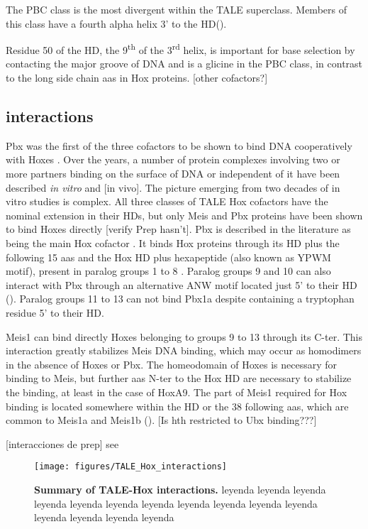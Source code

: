 The PBC class is the most divergent within the \ac{TALE} superclass. Members of this class have a fourth alpha helix 3' to the \ac{HD}(\cite{Mukherjee2007}). 

Residue 50 of the \ac{HD}, the 9\textsuperscript{th} of the 3\textsuperscript{rd} helix, is important for base selection by contacting the major groove of DNA and is a glicine in the PBC class, in contrast to the long side chain \acp{aa} in Hox proteins. [other cofactors?]

\subsection{interactions}

Pbx was the first of the three cofactors to be shown to bind DNA cooperatively with Hoxes \cite{Chan1994}. Over the years, a number of protein complexes involving two or more partners binding on the surface of DNA or independent of it have been described \textit{in vitro} and [in vivo]. The picture emerging from two decades of in vitro studies is complex. 
All three classes of \ac{TALE} Hox cofactors have the nominal extension in their \acp{HD}, but only Meis and Pbx proteins have been shown to bind Hoxes directly [verify Prep hasn't]. Pbx is described in the literature as being the main Hox cofactor \cite{ref}. It binds Hox proteins through its \ac{HD} plus the following 15 \acp{aa} and the Hox \ac{HD} plus hexapeptide (also known as YPWM motif), present in paralog groups 1 to 8 \cite{Chang1995, Passner1999}. Paralog groups 9 and 10 can also interact with Pbx through an alternative ANW motif located just 5' to their \ac{HD} (\cite{Chang1996, Shen1997a}). Paralog groups 11 to 13 can not bind Pbx1a despite containing a tryptophan residue 5' to their \ac{HD}. 

Meis1 can bind directly Hoxes belonging to groups 9 to 13 through its \ac{C-ter}. This interaction greatly stabilizes Meis DNA binding, which may occur as homodimers in the absence of Hoxes or Pbx. The homeodomain of Hoxes is necessary for binding to Meis, but further \acp{aa} \ac{N-ter} to the Hox \ac{HD} are necessary to stabilize the binding, at least in the case of HoxA9. The part of Meis1 required for Hox binding is located somewhere within the \ac{HD} or the 38 following \acp{aa}, which are common to Meis1a and Meis1b (\cite{Shen1997}). [Is hth restricted to Ubx binding???]

[interacciones de prep]
see \cite{Mann1996}

\begin{figure}[]
  
  \centering
  \label{fig:TALE_Hox_interactions}
  \texttt{[image: figures/TALE\_Hox\_interactions]}
  \caption[Summary of TALE-Hox interactions]{\textbf{Summary of TALE-Hox interactions.} leyenda leyenda leyenda leyenda leyenda leyenda leyenda leyenda leyenda leyenda leyenda leyenda leyenda leyenda leyenda}
\end{figure}

